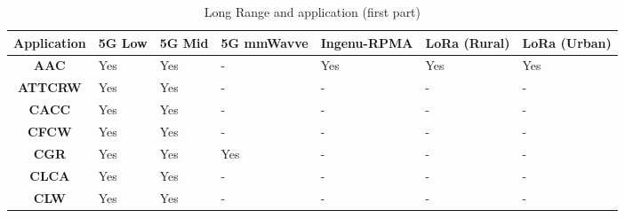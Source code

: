 
\begin{table}[ht!]
\centering
\caption{Long Range and application (first part)}
    \label{fig:techandapplong}
\begin{tabular}{cllllll}
\hline
\textbf{Application} & \multicolumn{1}{c}{\textbf{5G Low}} & \multicolumn{1}{c}{\textbf{5G Mid}} & \multicolumn{1}{c}{\textbf{5G mmWavve}} & \multicolumn{1}{c}{\textbf{Ingenu-RPMA}} & \multicolumn{1}{c}{\textbf{LoRa (Rural)}} & \multicolumn{1}{c}{\textbf{LoRa (Urban)}} \\
\hline
\textbf{AAC}         & Yes                                 & Yes                                 & -                                       & Yes                                      & Yes                                       & Yes                                       \\
\textbf{ATTCRW}      & Yes                                 & Yes                                 & -                                       & -                                        & -                                         & -                                         \\
\textbf{CACC}        & Yes                                 & Yes                                 & -                                       & -                                        & -                                         & -                                         \\
\textbf{CFCW}        & Yes                                 & Yes                                 & -                                       & -                                        & -                                         & -                                         \\
\textbf{CGR}         & Yes                                 & Yes                                 & Yes                                     & -                                        & -                                         & -                                         \\
\textbf{CLCA}        & Yes                                 & Yes                                 & -                                       & -                                        & -                                         & -                                         \\
\textbf{CLW}         & Yes                                 & Yes                                 & -                                       & -                                        & -                                         & -                                         \\

\end{tabular}
\end{table}
